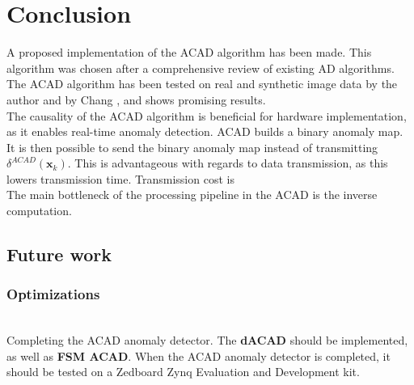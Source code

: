 \newpage
\chapter{Conclusion}
\label{sec:conclusion}



%
A proposed implementation of the ACAD algorithm has been made. This algorithm was chosen after a comprehensive review of existing AD algorithms. The ACAD algorithm has been tested on real and synthetic image data by the author and by Chang \cite{chang2006characterization}, and shows promising results. \\

The causality of the ACAD algorithm is beneficial for hardware implementation, as it enables real-time anomaly detection. ACAD builds a binary anomaly map. It is then possible to send the binary anomaly map instead of transmitting $\delta^{ACAD}(\textbf{x}_{k})$. This is advantageous with regards to data transmission, as this lowers transmission time. Transmission cost is  \\

The main bottleneck of the processing pipeline in the ACAD is the inverse computation. 

\section{Future work}

\subsection{Optimizations}


\\ 
Completing the ACAD anomaly detector. The \textbf{dACAD} should be implemented, as well as \textbf{FSM ACAD}. When the ACAD anomaly detector is completed, it should be tested on a Zedboard Zynq Evaluation and Development kit.



